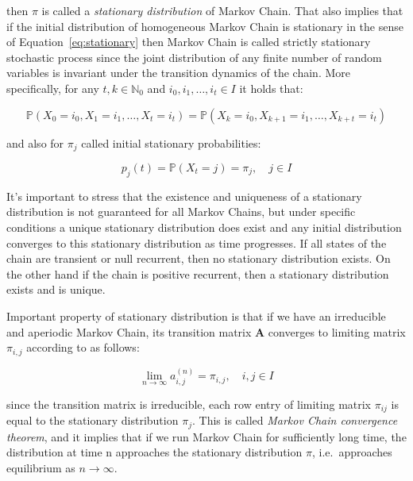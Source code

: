 then $\pi$ is called a \textit{stationary distribution} of Markov Chain. That also implies that if the initial distribution of homogeneous Markov Chain is stationary in the sense of Equation~\ref{eq:stationary}
then Markov Chain is called strictly stationary stochastic process since the joint distribution of any finite number of random variables is invariant under the transition dynamics of the chain.
More specifically, for any $t,k \in \mathbb{N}_0$ and $i_0,i_1,\ldots,i_t \in I$ it holds that:

\begin{equation}
    \mathbb{P}(X_0=i_0,X_1=i_1,\ldots,X_t=i_t) = \mathbb{P}(X_k=i_0,X_{k+1}=i_1,\ldots,X_{k+t}=i_t)
\end{equation}

and also for $\pi_j$ called initial stationary probabilities:

\begin{equation} \label{eq:init_stationary}
    p_j(t) = \mathbb{P}(X_t = j) = \pi_j, \quad j \in I
\end{equation}

It's important to stress that the existence and uniqueness of a stationary distribution 
is not guaranteed for all Markov Chains, but under specific conditions a unique stationary 
distribution does exist and any initial distribution converges to this stationary distribution \citep{Praskova2012} as time progresses.
If all states of the chain are transient or null recurrent, then no stationary distribution exists. On the other hand if the chain is
positive recurrent, then a stationary distribution exists and is unique.

Important property of stationary distribution is that if we have an irreducible and aperiodic Markov Chain, 
its transition matrix $\textbf{A}$ converges to limiting matrix $\pi_{i,j}$ according to \citep{Haggstrom2002} as follows:

\begin{equation}
    \lim_{n \to \infty} a_{i,j}^{(n)} = \pi_{i,j}, \quad i,j \in I
\end{equation}

since the transition matrix is irreducible, each row entry of limiting matrix $\pi_{ij}$ is equal to the stationary distribution $\pi_j$. This is called \textit{Markov Chain convergence theorem}, and it implies that if we run 
Markov Chain for sufficiently long time, the distribution at time n approaches the stationary distribution $\pi$, i.e.\ approaches equilibrium as $n \to \infty$.
 
